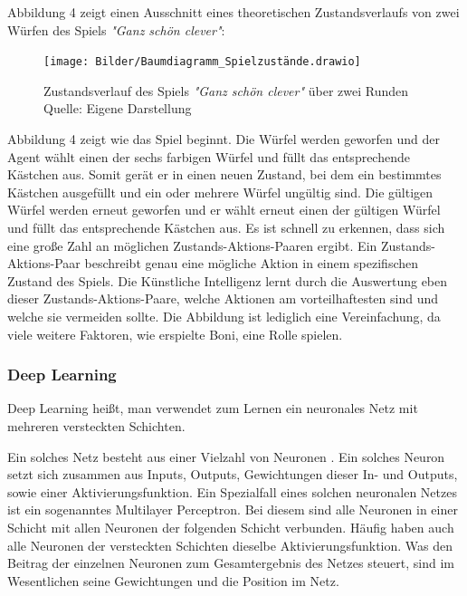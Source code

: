 Abbildung 4 zeigt einen Ausschnitt eines theoretischen Zustandsverlaufs von zwei Würfen des Spiels \textit{"Ganz schön clever"}:
\nopagebreak
\begin{figure}[H]
	\texttt{[image: Bilder/Baumdiagramm\_Spielzustände.drawio]} 
	\caption[Zustandsverlauf des Spiels \textit{"Ganz schön clever"} über zwei Runden]{Zustandsverlauf des Spiels \textit{"Ganz schön clever"} über zwei Runden\\ Quelle: Eigene Darstellung}
\end{figure}	

Abbildung 4 zeigt wie das Spiel beginnt. Die Würfel werden geworfen und der Agent wählt einen der sechs farbigen Würfel und füllt das entsprechende Kästchen aus. Somit gerät er in einen neuen Zustand, bei dem ein bestimmtes Kästchen ausgefüllt und ein oder mehrere Würfel ungültig sind. Die gültigen Würfel werden erneut geworfen und er wählt erneut einen der gültigen Würfel und füllt das entsprechende Kästchen aus. Es ist schnell zu erkennen, dass sich eine große Zahl an möglichen Zustands-Aktions-Paaren ergibt. Ein Zustands-Aktions-Paar beschreibt genau eine mögliche Aktion in einem spezifischen Zustand des Spiels. Die Künstliche Intelligenz lernt durch die Auswertung eben dieser Zustands-Aktions-Paare, welche Aktionen am vorteilhaftesten sind und welche sie vermeiden sollte. Die Abbildung ist lediglich eine Vereinfachung, da viele weitere Faktoren, wie erspielte Boni, eine Rolle spielen.
\subsubsection{Deep Learning}
Deep Learning heißt, man verwendet zum Lernen ein neuronales Netz mit mehreren versteckten Schichten. 

Ein solches Netz besteht aus einer Vielzahl von Neuronen \cite[S. 75]{sewak_deep_2019}. Ein solches Neuron setzt sich zusammen aus Inputs, Outputs, Gewichtungen dieser In- und Outputs, sowie einer Aktivierungsfunktion. Ein Spezialfall eines solchen neuronalen Netzes ist ein sogenanntes Multilayer Perceptron. Bei diesem sind alle Neuronen in einer Schicht mit allen Neuronen der folgenden Schicht verbunden. Häufig haben auch alle Neuronen der versteckten Schichten dieselbe Aktivierungsfunktion. Was den Beitrag der einzelnen Neuronen zum Gesamtergebnis des Netzes steuert, sind im Wesentlichen seine Gewichtungen und die Position im Netz.\\

